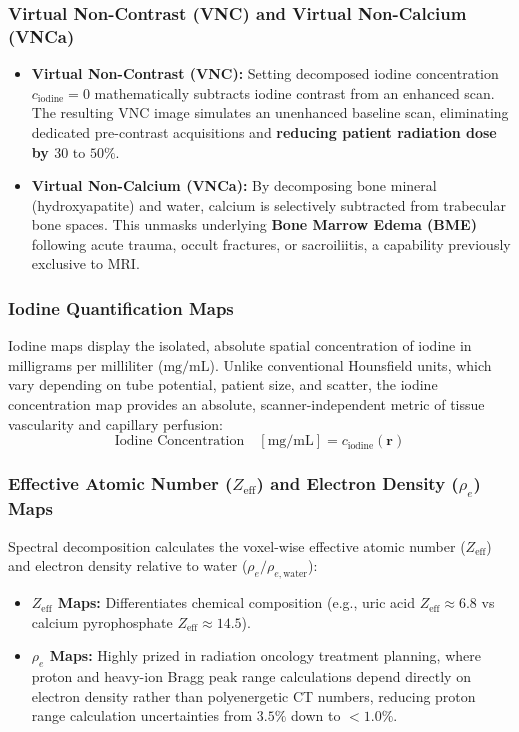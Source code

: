 \documentclass[11pt,a4paper]{article}
\begin{document}
\subsubsection{Virtual Non-Contrast (VNC) and Virtual Non-Calcium (VNCa)}
\begin{itemize}[leftmargin=2em]
    \item \textbf{Virtual Non-Contrast (VNC):} Setting decomposed iodine concentration $c_{\text{iodine}} = 0$ mathematically subtracts iodine contrast from an enhanced scan. The resulting VNC image simulates an unenhanced baseline scan, eliminating dedicated pre-contrast acquisitions and \textbf{reducing patient radiation dose by $30\text{ to }50\%$}.
    \item \textbf{Virtual Non-Calcium (VNCa):} By decomposing bone mineral (hydroxyapatite) and water, calcium is selectively subtracted from trabecular bone spaces. This unmasks underlying \textbf{Bone Marrow Edema (BME)} following acute trauma, occult fractures, or sacroiliitis, a capability previously exclusive to MRI.
\end{itemize}

\subsubsection{Iodine Quantification Maps}
Iodine maps display the isolated, absolute spatial concentration of iodine in milligrams per milliliter ($\text{mg/mL}$). Unlike conventional Hounsfield units, which vary depending on tube potential, patient size, and scatter, the iodine concentration map provides an absolute, scanner-independent metric of tissue vascularity and capillary perfusion:
\begin{equation}
    \text{Iodine Concentration} \quad [\text{mg/mL}] = c_{\text{iodine}}(\mathbf{r})
\end{equation}

\subsubsection{Effective Atomic Number (\texorpdfstring{$Z_{\text{eff}}$}{Zeff}) and Electron Density (\texorpdfstring{$\rho_e$}{rho\_e}) Maps}
Spectral decomposition calculates the voxel-wise effective atomic number ($Z_{\text{eff}}$) and electron density relative to water ($\rho_e / \rho_{e, \text{water}}$):
\begin{itemize}[leftmargin=2em]
    \item \textbf{$Z_{\text{eff}}$ Maps:} Differentiates chemical composition (e.g., uric acid $Z_{\text{eff}} \approx 6.8$ vs calcium pyrophosphate $Z_{\text{eff}} \approx 14.5$).
    \item \textbf{$\rho_e$ Maps:} Highly prized in radiation oncology treatment planning, where proton and heavy-ion Bragg peak range calculations depend directly on electron density rather than polyenergetic CT numbers, reducing proton range calculation uncertainties from $3.5\%$ down to $< 1.0\%$.
\end{itemize}
\end{document}
